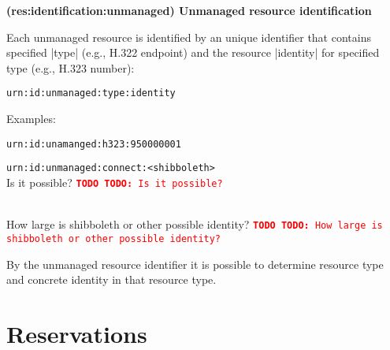 \documentclass[a4paper]{report}
\makeatletter
\newcounter{UCcounter}
\newenvironment{UseCases}%
	{\begin{list}{\textbf{UC-\arabic{UCcounter}}}{\@nmbrlisttrue\def\@listctr{UCcounter}}}%
	{\end{list}}
\newcommand{\UClabel}[1]{\label{UC:#1}}
\newcommand{\UseCase}[2]{\item\UClabel{#2} \textbf{(#2) #1}\\ \nopagebreak}
\newcommand{\TODO}[1]{%
\def\empty{}%
\def\prvniparametr{#1}%
\ifx\prvniparametr\empty%
\begingroup\tt\textcolor{red}{\noindent\textbf{TODO}}\endgroup
\else%
\begingroup\tt\textcolor{red}{\noindent\textbf{TODO:}\ #1}\endgroup
\fi%
}
\makeatother
\begin{document}
\begin{UseCases}
\UseCase{Unmanaged resource identification}{res:identification:unmanaged}

Each unmanaged resource is identified by an unique identifier that contains specified |type| (e.g., H.322 endpoint) and the resource |identity| for specified type (e.g., H.323 number):
\begin{verbatim}
urn:id:unmanaged:type:identity
\end{verbatim}
Examples: 
\begin{compactitem}
\item \verb|urn:id:unamanged:h323:950000001|
\item \verb|urn:id:unmanaged:connect:<shibboleth>| 
\\ \TODO{Is it possible?}
\\ \TODO{How large is shibboleth or other possible identity?}
\end{compactitem}

By the unmanaged resource identifier it is possible to determine resource type and concrete identity in that resource type.

\end{UseCases}


\section{Reservations}
\end{document}
